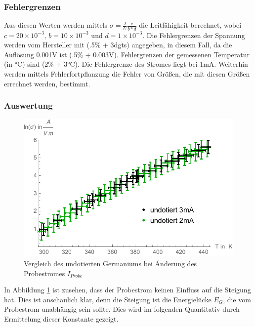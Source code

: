 \subsubsection{Fehlergrenzen}
Aus diesen Werten werden mittels $\sigma=\frac{I}{U}\frac{c}{b *d}$ die Leitfähigkeit berechnet, wobei $c=20 \times 10^{-3}$, $b=10 \times 10^{-3}$ und $d=1 \times 10^{-3}$. Die Fehlergrenzen der Spannung werden vom Hersteller mit (.5\% + 3dgts) angegeben, in diesem Fall, da die Auflösung 0.001V ist (.5\% + 0.003V). Fehlergrenzen der gemessenen Temperatur (in °C) sind (2\% + 3°C). Die Fehlergrenze des Stromes liegt bei 1mA. Weiterhin werden mittels Fehlerfortpflanzung die Fehler von Größen, die mit diesen Größen errechnet werden, bestimmt.\\

\subsubsection{Auswertung}
\begin{figure}[H]
	\centering
\includegraphics[width=0.9\linewidth]{IMAGE/M2_Stromvergleich.pdf}
	\caption{Vergleich des undotierten Germaniums bei Änderung des Probestromes $I_{Probe}$}
	\label{fig:M2_4}
\end{figure} 

In Abbildung \ref{fig:M2_4} ist zusehen, dass der Probestrom keinen Einfluss auf die Steigung hat. Dies ist anschaulich klar, denn die Steigung ist die Energielücke $E_{G}$, die vom Probestrom unabhängig sein sollte. Dies wird im folgenden Quantitativ durch Ermittelung dieser Konstante gezeigt.\\

